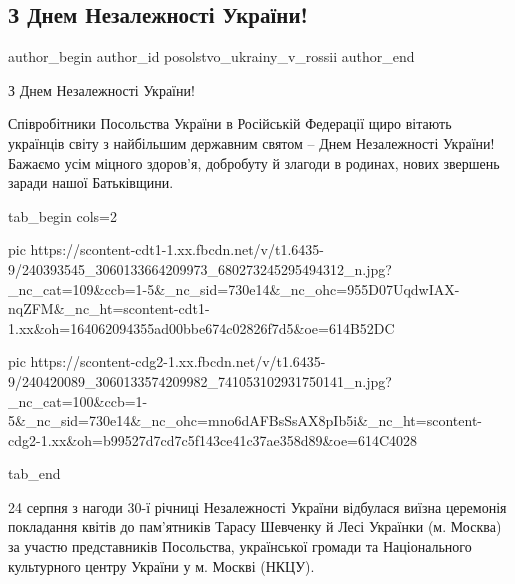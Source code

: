  
 
 
 
 
 
\subsection{З Днем Незалежності України!}
\label{sec:24_08_2021.fb.posolstvo_ukrainy_v_rossii.1.nezalezhnist_moskva}
 
\ifcmt
 author_begin
   author_id posolstvo_ukrainy_v_rossii
 author_end
\fi

З Днем Незалежності України!

Співробітники Посольства України в Російській Федерації щиро вітають українців
світу з найбільшим державним святом – Днем Незалежності України! Бажаємо усім
міцного здоров'я, добробуту й злагоди в родинах, нових звершень заради нашої
Батьківщини.


\ifcmt
  tab_begin cols=2

     pic https://scontent-cdt1-1.xx.fbcdn.net/v/t1.6435-9/240393545_3060133664209973_680273245295494312_n.jpg?_nc_cat=109&ccb=1-5&_nc_sid=730e14&_nc_ohc=955D07UqdwIAX-nqZFM&_nc_ht=scontent-cdt1-1.xx&oh=164062094355ad00bbe674c02826f7d5&oe=614B52DC

     pic https://scontent-cdg2-1.xx.fbcdn.net/v/t1.6435-9/240420089_3060133574209982_741053102931750141_n.jpg?_nc_cat=100&ccb=1-5&_nc_sid=730e14&_nc_ohc=mno6dAFBsSsAX8pIb5i&_nc_ht=scontent-cdg2-1.xx&oh=b99527d7cd7c5f143ce41c37ae358d89&oe=614C4028

  tab_end
\fi

24 серпня з нагоди 30-ї річниці Незалежності України відбулася виїзна церемонія
покладання квітів до пам’ятників Тарасу Шевченку й Лесі Українки (м. Москва) за
участю представників Посольства, української громади та Національного
культурного центру України у м. Москві (НКЦУ).

\ifcmt

